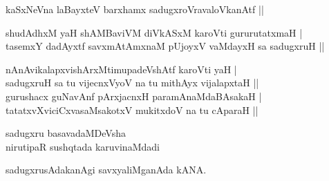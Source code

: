\begin{entry}
\end{entry}

\begin{entry}
\begin{shl}
kaSxNeVna laBayxteV barxhamx sadugxroVravaloVkanAtf ||
\end{shl}
\begin{shl}
shudAdhxM yaH shAMBaviVM diVkASxM karoVti gururutatxmaH |\\
tasemxY dadAyxtf savxmAtAmxnaM pUjoyxV vaMdayxH sa sadugxruH ||
\end{shl}
\begin{shl}
nAnAvikalapxvishArxMtimupadeVshAtf karoVti yaH |\\
sadugxruH sa tu vijecnxVyoV na tu mithAyx vijalapxtaH ||\\
gurushacx guNavAnf pArxjacnxH paramAnaMdaBAsakaH |\\
tatatxvXviciCxvasaMsakotxV mukitxdoV na tu cAparaH ||
\end{shl}

\gl{}
\begin{shl}
sadugxru basavadaMDeVsha\\
nirutipaR sushqtada karuvinaMdadi
\end{shl}
\gl{}
\begin{shl}
sadugxrusAdakanAgi savxyaliMganAda kANA.
\end{shl}
\end{entry}

